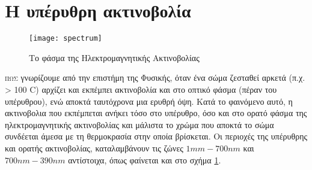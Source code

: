 


\section{Η υπέρυθρη ακτινοβολία}

\begin{figure}
  \centering
  \texttt{[image: spectrum]}
  \caption{Το φάσμα της Ηλεκτρομαγνητικής Ακτινοβολίας}
  \label{fig:spectrum}
\end{figure}


\lettrine[findent=2pt]{}{πως} γνωρίζουμε από την επιστήμη της Φυσικής, όταν ένα σώμα ζεσταθεί αρκετά (π.χ. > 100 C) αρχίζει και εκπέμπει ακτινοβολία και στο οπτικό φάσμα (πέραν του υπέρυθρου), ενώ αποκτά ταυτόχρονα μια ερυθρή όψη. Κατά το φαινόμενο αυτό, η ακτινοβολια που εκπέμπεται ανήκει τόσο στο υπέρυθρο, όσο και στο ορατό φάσμα της ηλεκτρομαγνητικής ακτινοβολίας και μάλιστα το χρώμα που αποκτά το σώμα συνδέεται άμεσα με τη θερμοκρασία στην οποία βρίσκεται. Οι περιοχές της υπέρυθρης και ορατής ακτινοβολίας, καταλαμβάνουν τις ζώνες $1mm - 700nm$ και $700nm - 390nm$ αντίστοιχα, όπως φαίνεται και στο σχήμα \ref{fig:spectrum}.
